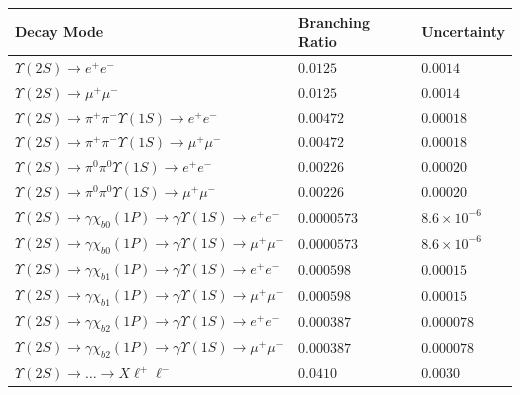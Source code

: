 \documentclass[landscape]{article}
\begin{document}
\begin{minipage}{8 in}
\vspace{1 cm}
\begin{tabular}{p{4.6 in} p{2 in} p{1.3 in}}
Decay Mode & Branching Ratio & Uncertainty \\ \hline
$   \Upsilon(2S) \to e^+ e^-                                                        $ & $   0.0125      $ & $   0.0014     $ \\ 
$   \Upsilon(2S) \to \mu^+ \mu^-                                                    $ & $   0.0125      $ & $   0.0014     $ \\ 
$   \Upsilon(2S) \to \pi^+ \pi^- \Upsilon(1S) \to e^+ e^-                           $ & $   0.00472     $ & $   0.00018    $ \\ 
$   \Upsilon(2S) \to \pi^+ \pi^- \Upsilon(1S) \to \mu^+ \mu^-                       $ & $   0.00472     $ & $   0.00018    $ \\ 
$   \Upsilon(2S) \to \pi^0 \pi^0 \Upsilon(1S) \to e^+ e^-                           $ & $   0.00226     $ & $   0.00020    $ \\ 
$   \Upsilon(2S) \to \pi^0 \pi^0 \Upsilon(1S) \to \mu^+ \mu^-                       $ & $   0.00226     $ & $   0.00020    $ \\ 
$   \Upsilon(2S) \to \gamma \chi_{b0}(1P) \to \gamma \Upsilon(1S) \to e^+ e^-       $ & $   0.0000573   $ & $   8.6 \times 10^{-6}  $ \\ 
$   \Upsilon(2S) \to \gamma \chi_{b0}(1P) \to \gamma \Upsilon(1S) \to \mu^+ \mu^-   $ & $   0.0000573   $ & $   8.6 \times 10^{-6}  $ \\ 
$   \Upsilon(2S) \to \gamma \chi_{b1}(1P) \to \gamma \Upsilon(1S) \to e^+ e^-       $ & $   0.000598    $ & $   0.00015    $ \\ 
$   \Upsilon(2S) \to \gamma \chi_{b1}(1P) \to \gamma \Upsilon(1S) \to \mu^+ \mu^-   $ & $   0.000598    $ & $   0.00015    $ \\ 
$   \Upsilon(2S) \to \gamma \chi_{b2}(1P) \to \gamma \Upsilon(1S) \to e^+ e^-       $ & $   0.000387    $ & $   0.000078   $ \\ 
$   \Upsilon(2S) \to \gamma \chi_{b2}(1P) \to \gamma \Upsilon(1S) \to \mu^+ \mu^-   $ & $   0.000387    $ & $   0.000078   $ \\\hline\hline
$   \Upsilon(2S) \to \ldots \to X \ell^+ \ell^-                                     $ & $   0.0410      $ & $   0.0030     $ \\\hline
\end{tabular}


\end{minipage}
\end{document}
